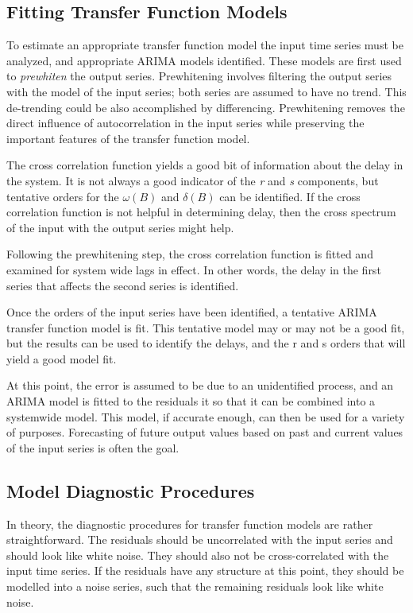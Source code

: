 \documentclass[12pt]{report}
\begin{document}
\subsection{Fitting Transfer Function Models}

To estimate an appropriate transfer function model the input time
series must be analyzed, and appropriate ARIMA models identified.
These models are first used to \textit{prewhiten} the output
series. Prewhitening involves filtering the output series with the
model of the input series; both series are assumed to have no
trend.  This de-trending could be also accomplished by
differencing. Prewhitening removes the direct influence of
autocorrelation in the input series while preserving the important
features of the transfer function model.

The cross correlation function yields a good bit of information
about the delay in the system.  It is not always a good indicator
of the \textit{r} and \textit{s} components, but tentative orders
for the $\omega(B)$ and $\delta(B)$ can be identified. If the
cross correlation function is not helpful in determining delay,
then the cross spectrum of the input with the output series might
help.

Following the prewhitening step, the cross correlation function is
fitted and examined for system wide lags in effect. In other
words, the delay in the first series that affects the second
series is identified.

Once the orders of the input series have been identified, a
tentative ARIMA transfer function model is fit.  This tentative
model may or may not be a good fit, but the results can be used to
identify the delays, and the r and s orders that will yield a good
model fit.

At this point, the error is assumed to be due to an unidentified
process, and an ARIMA model is fitted to the residuals it so that
it can be combined into a systemwide model.  This model, if
accurate enough, can then be used for a variety of purposes.
Forecasting of future output values based on past and current
values of the input series is often the goal.

\subsection{Model Diagnostic Procedures}
In theory, the diagnostic procedures for transfer function models
are rather straightforward.  The residuals should be uncorrelated
with the input series and should look like white noise. They
should also not be cross-correlated with the input time series. If
the residuals have any structure at this point, they should be
modelled into a noise series, such that the remaining residuals
look like white noise.
\end{document}
